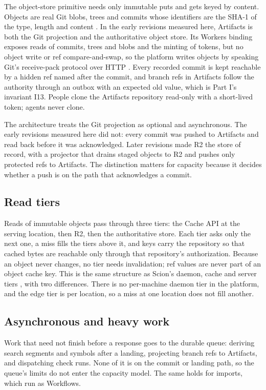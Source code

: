 \documentclass[11pt,letterpaper]{article}
\theoremstyle{definition}
\theoremstyle{remark}
\begin{document}
The object-store primitive needs only immutable puts and gets keyed by content. Objects are real Git blobs, trees and commits whose identifiers are the SHA-1 of the type, length and content \cite{gitobjects}. In the early revisions measured here, Artifacts is both the Git projection and the authoritative object store. Its Workers binding exposes reads of commits, trees and blobs and the minting of tokens, but no object write or ref compare-and-swap, so the platform writes objects by speaking Git's receive-pack protocol over HTTP \cite{cfartifacts,gitprotocol}. Every recorded commit is kept reachable by a hidden ref named after the commit, and branch refs in Artifacts follow the authority through an outbox with an expected old value, which is Part I's invariant I13. People clone the Artifacts repository read-only with a short-lived token; agents never clone.

The architecture treats the Git projection as optional and asynchronous. The early revisions measured here did not: every commit was pushed to Artifacts and read back before it was acknowledged. Later revisions made R2 the store of record, with a projector that drains staged objects to R2 and pushes only protected refs to Artifacts. The distinction matters for capacity because it decides whether a push is on the path that acknowledges a commit.

\subsection{Read tiers}

Reads of immutable objects pass through three tiers: the Cache API at the serving location, then R2, then the authoritative store. Each tier asks only the next one, a miss fills the tiers above it, and keys carry the repository so that cached bytes are reachable only through that repository's authorization. Because an object never changes, no tier needs invalidation; ref values are never part of an object cache key. This is the same structure as Scion's daemon, cache and server tiers \cite{anthropic2026scion}, with two differences. There is no per-machine daemon tier in the platform, and the edge tier is per location, so a miss at one location does not fill another.

\subsection{Asynchronous and heavy work}

Work that need not finish before a response goes to the durable queue: deriving search segments and symbols after a landing, projecting branch refs to Artifacts, and dispatching check runs. None of it is on the commit or landing path, so the queue's limits do not enter the capacity model. The same holds for imports, which run as Workflows.
\end{document}
